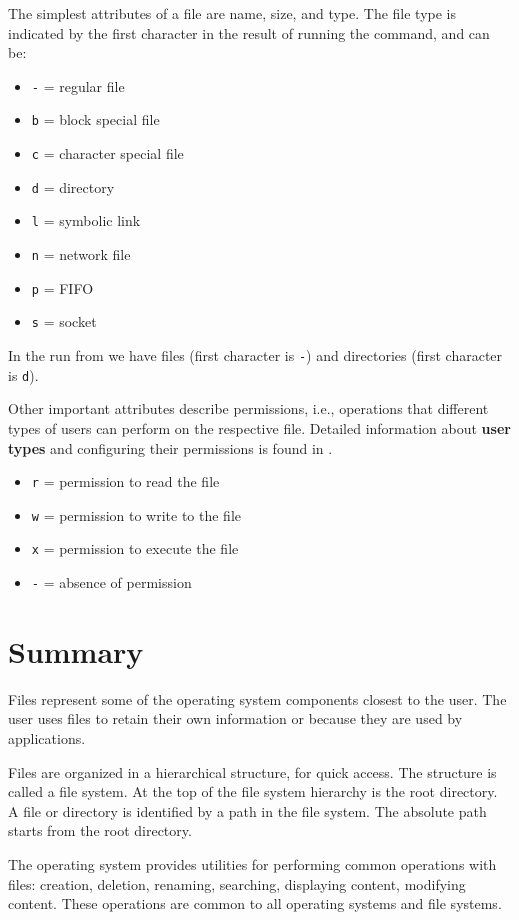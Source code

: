 The simplest attributes of a file are name, size, and type.
The file type is indicated by the first character in the result of running the  command, and can be:

\begin{itemize}
  \item \texttt{-} = regular file
  \item \texttt{b} = block special file
  \item \texttt{c} = character special file
  \item \texttt{d} = directory
  \item \texttt{l} = symbolic link
  \item \texttt{n} = network file
  \item \texttt{p} = FIFO
  \item \texttt{s} = socket
\end{itemize}

In the run from  we have files (first character is \texttt{-}) and directories (first character is \texttt{d}).

Other important attributes describe permissions, i.e., operations that different types of users can perform on the respective file.
Detailed information about \textbf{user types} and configuring their permissions is found in .

\begin{itemize}
  \item \texttt{r} = permission to read the file
  \item \texttt{w} = permission to write to the file
  \item \texttt{x} = permission to execute the file
  \item \texttt{-} = absence of permission
\end{itemize}

\section{Summary}
\label{sec:data-files:summary}

Files represent some of the operating system components closest to the user.
The user uses files to retain their own information or because they are used by applications.

Files are organized in a hierarchical structure, for quick access.
The structure is called a file system.
At the top of the file system hierarchy is the root directory.
A file or directory is identified by a path in the file system.
The absolute path starts from the root directory.

The operating system provides utilities for performing common operations with files: creation, deletion, renaming, searching, displaying content, modifying content.
These operations are common to all operating systems and file systems.
